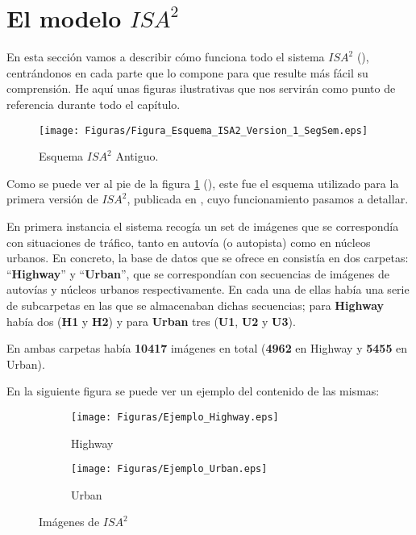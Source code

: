 \section{El modelo $ISA^{2}$}
\label{sec:isa2_model}

En esta sección vamos a describir cómo funciona todo el sistema $ISA^{2}$ (\cite{isa2}), centrándonos en cada parte que lo compone para que resulte más fácil su comprensión. He aquí unas figuras ilustrativas que nos servirán como punto de referencia durante todo el capítulo.


\begin{figure}[H]
  \centering
  \texttt{[image: Figuras/Figura\_Esquema\_ISA2\_Version\_1\_SegSem.eps]}
  \caption{Esquema $ISA^{2}$ Antiguo.}
  \label{fig:Isa_v1}
\end{figure}

Como se puede ver al pie de la figura \ref{fig:Isa_v1} (\cite{isa2}), este fue el esquema utilizado para la primera versión de $ISA^{2}$, publicada en \cite{isa2}, cuyo funcionamiento pasamos a detallar.


En primera instancia el sistema recogía un set de imágenes que se correspondía con situaciones de tráfico, tanto en autovía (o autopista) como en núcleos urbanos. En concreto, la base de datos que se ofrece en \cite{isa2} consistía en dos carpetas: ``\textbf{Highway}'' y ``\textbf{Urban}'', que se correspondían con secuencias de imágenes de autovías y núcleos urbanos respectivamente. En cada una de ellas había una serie de subcarpetas en las que se almacenaban dichas secuencias; para \textbf{Highway} había dos (\textbf{H1} y \textbf{H2}) y para \textbf{Urban} tres (\textbf{U1}, \textbf{U2} y \textbf{U3}).

En ambas carpetas había \textbf{10417} imágenes en total (\textbf{4962} en Highway y \textbf{5455} en Urban).

En la siguiente figura se puede ver un ejemplo del contenido de las mismas:

\begin{figure}[H]
  \centering
  \begin{subfigure}[b]{0.45\linewidth}
    \texttt{[image: Figuras/Ejemplo\_Highway.eps]}
    \caption{Highway}
  \end{subfigure}
    \begin{subfigure}[b]{0.45\linewidth}
    \texttt{[image: Figuras/Ejemplo\_Urban.eps]}
    \caption{Urban}
  \end{subfigure}
  \caption{Imágenes de $ISA^{2}$}
  \label{fig:HyU}
\end{figure}

